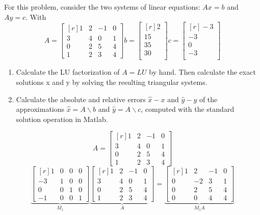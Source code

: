 \documentclass{jhwhw}
\begin{document}
\problem{}
For this problem, consider the two systems of linear equations:
\(Ax=b\) and \(Ay = c\).
With
\[
A = 
	\begin{bmatrix*}[r]
	  1     &    2    &    -1   &  0 \\
	  3     &    4    &     0   &  1 \\
	  0     &    2    &     5   &  4 \\
	  1     &    2    &     3   &  4 
	\end{bmatrix*}
b = 
	\begin{bmatrix*}[r]
	    2  \\
	   15  \\
	   35  \\
	   30  \\
	\end{bmatrix*}
c = 
	\begin{bmatrix*}[r]
	   -3  \\
	   -3  \\
	    0 \\
	   -3  \\
	\end{bmatrix*}
\]
	\begin{enumerate}
	  \item Calculate the LU factorization of \(A=LU\) by hand. Then calculate the
		exact solutions x and y by solving the resulting triangular systems.
	  \item Calculate the absolute and relative errors \(\hat{x}-x\) and
		\(\hat{y}-y\) of the approximations \( \hat{x} = A \backslash b \) and \(\hat{y}=A \backslash c \),
		computed with the standard solution operation in Matlab.
	\end{enumerate}
\solution
\[
A = 
	\begin{bmatrix*}[r]
	  1     &    2    &    -1   &  0 \\
	  3     &    4    &     0   &  1 \\
	  0     &    2    &     5   &  4 \\
	  1     &    2    &     3   &  4 
	\end{bmatrix*}
\] 
\[
	\underbrace{\begin{bmatrix*}[r]
	  1     &    0    &     0   &  0 \\
	 -3     &    1    &     0   &  0 \\
	  0     &    0    &     1   &  0 \\
	 -1     &    0    &     0   &  1 
   \end{bmatrix*}}_{M_1}
   \underbrace{\begin{bmatrix*}[r]
	  1     &    2    &    -1   &  0 \\
	  3     &    4    &     0   &  1 \\
	  0     &    2    &     5   &  4 \\
	  1     &    2    &     3   &  4 
	\end{bmatrix*}}_{A}
	=
   \underbrace{\begin{bmatrix*}[r]
	  1     &    2    &    -1   &  0 \\
	  0     &   -2    &     3   &  1 \\
	  0     &    2    &     5   &  4 \\
	  0     &    0    &     4   &  4 
	\end{bmatrix*}}_{M_1A}
\]
\end{document}
